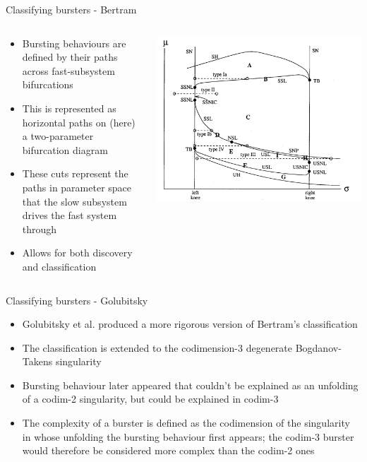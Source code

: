 \documentclass{beamer}
\begin{document}
\begin{frame}[label={sec:orgf79e540}]{Classifying bursters - Bertram}
\begin{columns}
\begin{column}{0.5\columnwidth}
\begin{itemize}
\item Bursting behaviours are defined by their paths across fast-subsystem bifurcations
\item This is represented as horizontal paths on (here) a two-parameter bifurcation diagram
\item These cuts represent the paths in parameter space that the slow subsystem drives the fast system through
\item Allows for both discovery and classification
\end{itemize}
\end{column}

\begin{column}{0.5\columnwidth}
\begin{center}
\includegraphics[height=.8\textheight]{bertrambif.png}
\end{center}
\end{column}
\end{columns}
\end{frame}

\begin{frame}[label={sec:orgcf636ee}]{Classifying bursters - Golubitsky}
\begin{itemize}
\item Golubitsky et al. produced a more rigorous version of Bertram's classification
\item The classification is extended to the codimension-3 degenerate Bogdanov-Takens singularity
\item Bursting behaviour later appeared that couldn't be explained as an unfolding of a codim-2 singularity, but could be explained in codim-3
\item The complexity of a burster is defined as the codimension of the singularity in whose unfolding the bursting behaviour first appears; the codim-3 burster would therefore be considered more complex than the codim-2 ones
\end{itemize}
\end{frame}
\end{document}
